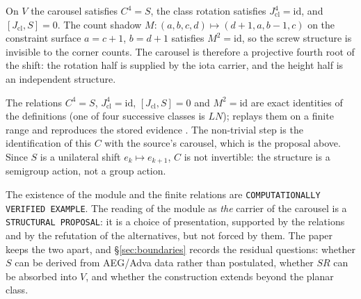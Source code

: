 \begin{proposal}\label{prop:carousel-screw}
On $V$ the carousel satisfies $C^{4}=S$, the class rotation satisfies
$J_{\mathrm{cl}}^{4}=\mathrm{id}$, and $[J_{\mathrm{cl}},S]=0$.  The count shadow
$M:(a,b,c,d)\mapsto(d+1,a,b-1,c)$ on the constraint surface $a=c+1$, $b=d+1$
satisfies $M^{2}=\mathrm{id}$, so the screw structure is invisible to the corner
counts.  The carousel is therefore a projective fourth root
of the shift: the rotation half is supplied by the iota carrier, and the height half
is an independent structure.
\end{proposal}

\begin{calibration}\label{cal:screw}
The relations $C^{4}=S$, $J_{\mathrm{cl}}^{4}=\mathrm{id}$,
$[J_{\mathrm{cl}},S]=0$ and $M^{2}=\mathrm{id}$ are exact identities of the definitions
(one of four successive classes is $LN$); 
replays them on a finite range and reproduces the stored evidence
.  The non-trivial step is the identification of this $C$
with the source's carousel, which is the proposal above.  Since $S$ is a unilateral
shift $e_k\mapsto e_{k+1}$, $C$ is not invertible: the structure is a semigroup action,
not a group action.
\end{calibration}

\begin{remark}\label{rem:screw-status}
The existence of the module and the finite relations are
\texttt{COMPUTATIONALLY VERIFIED EXAMPLE}.  The reading of the module as \emph{the}
carrier of the carousel is a \texttt{STRUCTURAL PROPOSAL}: it is a choice of
presentation, supported by the relations and by the refutation of the alternatives,
but not forced by them.  The paper keeps the two apart, and \S\ref{sec:boundaries}
records the residual questions: whether $S$ can be derived from AEG/Adva data rather
than postulated, whether $SR$ can be absorbed into $V$, and whether the construction
extends beyond the planar class.
\end{remark}
